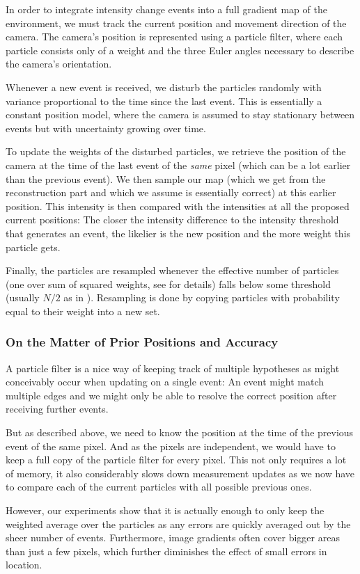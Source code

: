 In order to integrate intensity change events into a full gradient map of the
environment, we must track the current position and movement direction of the
camera.
The camera's position is represented using a particle filter, where each
particle consists only of a weight and the three Euler angles necessary to
describe the camera's orientation.

Whenever a new event is received, we disturb the particles randomly with
variance proportional to the time since the last event. This is essentially a
constant position model, where the camera is assumed to stay stationary between
events but with uncertainty growing over time.

To update the weights of the disturbed particles, we retrieve the position of
the camera at the time of the last event of the \textit{same} pixel (which can be a
lot earlier than the previous event). We then sample our map (which we get from the
reconstruction part and which we assume is essentially correct) at this earlier
position. This intensity is then compared with the intensities at all the
proposed current positions: The closer the intensity difference to the
intensity threshold that generates an event, the likelier is the new position
and the more weight this particle gets.

Finally, the particles are resampled whenever the effective number of particles
(one over sum of squared weights, see \cite{kim2014simultaneous} for details)
falls below some threshold (usually $N/2$ as in \cite{kim2014simultaneous}).
Resampling is done by copying particles with probability equal to their weight
into a new set.

\subsubsection{On the Matter of Prior Positions and Accuracy}

A particle filter is a nice way of keeping track of multiple hypotheses as
might conceivably occur when updating on a single event: An event might match
multiple edges and we might only be able to resolve the correct position after
receiving further events.

But as described above, we need to know the position at the time of the
previous event of the same pixel. And as the pixels are independent, we would
have to keep a full copy of the particle filter for every pixel. This not only
requires a lot of memory, it also considerably slows down measurement updates
as we now have to compare each of the current particles with all possible
previous ones.

However, our experiments show that it is actually enough to only keep the
weighted average over the particles as any errors are quickly averaged out by
the sheer number of events. Furthermore, image gradients often cover bigger
areas than just a few pixels, which further diminishes the effect of small
errors in location.
